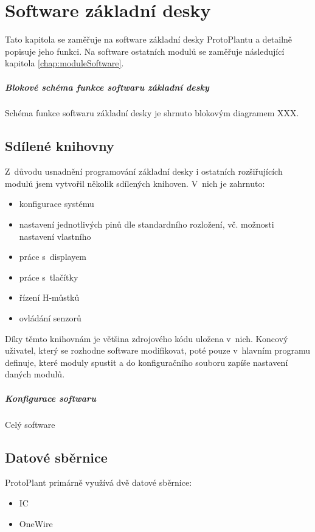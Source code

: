 \chapter{Software základní desky}
Tato kapitola se zaměřuje na software základní desky ProtoPlantu a detailně popisuje jeho funkci.
Na software ostatních modulů se zaměřuje následující kapitola \ref{chap:moduleSoftware}.

\paragraph{Blokové schéma funkce softwaru základní desky}
Schéma funkce softwaru základní desky je shrnuto blokovým diagramem XXX.

\section{Sdílené knihovny}
Z~důvodu usnadnění programování základní desky i ostatních rozšiřujících modulů jsem vytvořil několik sdílených knihoven. 
V~nich je zahrnuto:
\begin{itemize}
    \item konfigurace systému
    \item nastavení jednotlivých pinů dle standardního rozložení, vč. možnosti nastavení vlastního
    \item práce s~displayem
    \item práce s~tlačítky
    \item řízení H-můstků
    \item ovládání senzorů
\end{itemize}
Díky těmto knihovnám je většina zdrojového kódu uložena v~nich. 
Koncový uživatel, který se rozhodne software modifikovat, poté pouze v~hlavním programu definuje, které moduly spustit a do konfiguračního souboru zapíše nastavení daných modulů.


\paragraph{Konfigurace softwaru}
Celý software 

\section{Datové sběrnice}
ProtoPlant primárně využívá dvě datové sběrnice:
\begin{itemize}
    \item IC
    \item OneWire
\end{itemize}

